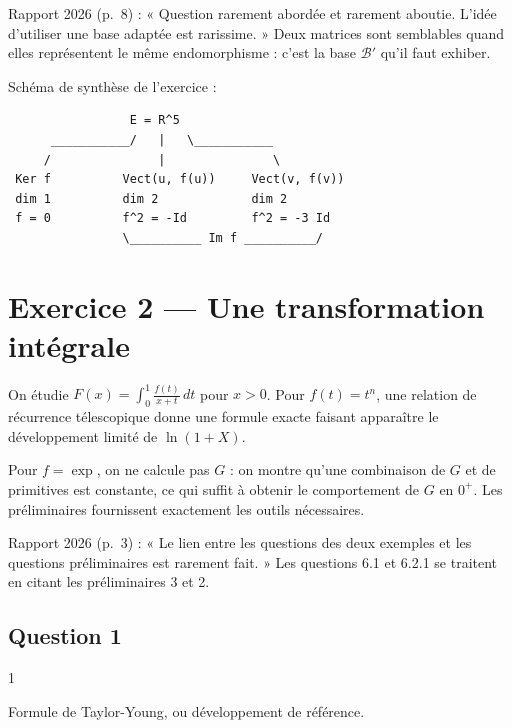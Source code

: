 \documentclass[11pt,a4paper]{article}
\begin{document}
\begin{jury}

Rapport 2026 (p.~8) : « Question rarement abordée et rarement aboutie. L'idée d'utiliser une base adaptée est rarissime. » Deux matrices sont semblables quand elles représentent le même endomorphisme : c'est la base \(\mathscr B'\) qu'il faut exhiber.

\end{jury}

Schéma de synthèse de l'exercice :

\begin{lstlisting}
                 E = R^5
      ___________/   |   \___________
     /               |               \
 Ker f          Vect(u, f(u))     Vect(v, f(v))
 dim 1          dim 2             dim 2
 f = 0          f^2 = -Id         f^2 = -3 Id
                \__________ Im f __________/
\end{lstlisting}

\hypertarget{exercice-2-une-transformation-intuxe9grale}{%
\section{Exercice 2 --- Une transformation intégrale}\label{exercice-2-une-transformation-intuxe9grale}}

On étudie \(F(x)=\int_0^1\frac{f(t)}{x+t}\,dt\) pour \(x>0\). Pour \(f(t)=t^n\), une relation de récurrence télescopique donne une formule exacte faisant apparaître le développement limité de \(\ln(1+X)\).

Pour \(f=\exp\), on ne calcule pas \(G\) : on montre qu'une combinaison de \(G\) et de primitives est constante, ce qui suffit à obtenir le comportement de \(G\) en \(0^+\). Les préliminaires fournissent exactement les outils nécessaires.

\begin{jury}

Rapport 2026 (p.~3) : « Le lien entre les questions des deux exemples et les questions préliminaires est rarement fait. » Les questions 6.1 et 6.2.1 se traitent en citant les préliminaires 3 et 2.

\end{jury}

\hypertarget{question-1-1}{%
\subsection{Question 1}\label{question-1-1}}

\begin{indication}{1}

Formule de Taylor-Young, ou développement de référence.

\end{indication}
\end{document}

